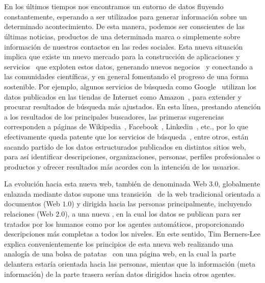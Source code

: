 \section{\linkeddata}
En los últimos tiempos nos encontramos un entorno de datos fluyendo constantemente, esperando a ser utilizados para generar información
sobre un determinado acontecimiento. De esta manera, podemos ser conscientes de las últimas noticias, productos de una determinada
marca o simplemente sobre información de nuestros contactos en las redes sociales. Esta nueva situación implica que existe un nuevo
mercado para la construcción de aplicaciones y servicios~\cite{Krafzig2004} que exploten estos datos, generando nuevos negocios~\cite{web20} y conectando a las comunidades
científicas, y en general fomentando el progreso de una forma sostenible. Por ejemplo, algunos servicios de búsqueda como Google~\cite{Google} utilizan los
datos publicados en las tiendas de Internet como Amazon~\cite{Amazon}, para extender y procurar resultados de búsqueda más ajustados. En esta línea, prestando 
atención a los resultados de los principales buscadores, las primeras sugerencias corresponden a páginas de Wikipedia~\cite{Wikipedia}, Facebook~\cite{Facebook},
 Linkedin~\cite{Linkedin}, etc.,  por lo que efectivamente queda patente que los servicios de búsqueda~\cite{Pound}, entre otros, están sacando partido de los datos estructurados publicados en distintos sitios web, para así identificar descripciones, organizaciones, personas, perfiles profesionales o productos y 
ofrecer resultados más acordes con la intención de los usuarios.

La evolución hacia esta nueva web, también de denominada Web $3.0$, globalmente enlazada mediante datos supone una transición~\cite{Ankolekar07thetwo}
de la web tradicional orientada a documentos (Web $1.0$) y dirigida hacia las personas principalmente, incluyendo relaciones (Web $2.0$),
a una nueva \wod, en la cual los datos se publican para ser tratados por los humanos como
por los agentes automáticos, proporcionando descripciones más completas a todos los niveles. En este
sentido, Tim Berners-Lee explica convenientemente los principios de esta nueva web realizando una analogía 
de una bolsa de patatas~\cite{TBL-crisps} con una página web, en la cual la parte delantera estaría orientada 
hacia las personas, mientas que la información (meta información) de la parte trasera serían datos
dirigidos hacia otros agentes.

